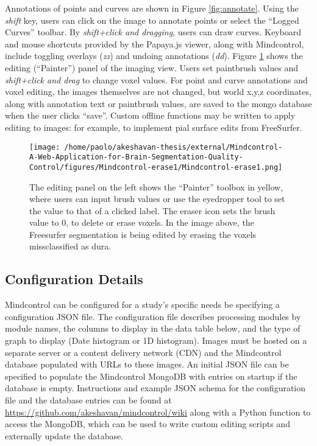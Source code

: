 Annotations of points and curves are shown in Figure \ref{fig:annotate}. Using the \textit{shift} key, users can click on the image to annotate points or select the ``Logged Curves'' toolbar. By \textit{shift+click and dragging}, users can draw curves. Keyboard and mouse shortcuts provided by the Papaya.js viewer, along with Mindcontrol, include toggling overlays (\textit{zz}) and undoing annotations (\textit{dd}). Figure \ref{fig:edit} shows the editing (``Painter'') panel of the imaging view. Users set paintbrush values and \textit{shift+click and drag} to change voxel values. For point and curve annotations and voxel editing, the images themselves are not changed, but world x,y,z coordinates, along with annotation text or paintbrush values, are saved to the mongo database when the user clicks ``save''. Custom offline functions may be written to apply editing to images: for example, to implement pial surface edits from FreeSurfer. 

\begin{figure}[]
\begin{center}
\texttt{[image: /home/paolo/akeshavan-thesis/external/Mindcontrol-A-Web-Application-for-Brain-Segmentation-Quality-Control/figures/Mindcontrol-erase1/Mindcontrol-erase1.png]}
\caption{ \protect\label{fig:edit}
The editing panel on the left shows the ``Painter'' toolbox in yellow, where users can input brush values or use the eyedropper tool to set the value to that of a clicked label. The eraser icon sets the brush value to 0, to delete or erase voxels. In the image above, the Freesurfer segmentation is being edited by erasing the voxels missclassified as dura.}
\end{center}
\end{figure}

\subsection{Configuration Details}

Mindcontrol can be configured for a study's specific needs be specifying a configuration JSON file. The configuration file describes processing modules by module names, the columns to display in the data table below, and the type of graph to display (Date histogram or 1D histogram). Images must be hosted on a separate server or a content delivery network (CDN) and the Mindcontrol database populated with URLs to these images. An initial JSON file can be specified to populate the Mindcontrol MongoDB with entries on startup if the database is empty. Instructions and example JSON schema for the configuration file and the database entries can be found at \url{https://github.com/akeshavan/mindcontrol/wiki} along with a Python function to access the MongoDB, which can be used to write custom editing scripts and externally update the database. 


